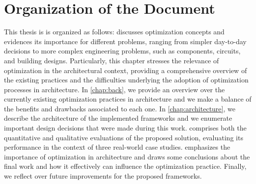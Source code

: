 \section{Organization of the Document}
This thesis is is organized as follows:  discusses optimization concepts and evidences its importance for different problems, ranging from simpler day-to-day decisions to more complex engineering problems, such as components, circuits, and building designs. Particularly, this chapter stresses the relevance of optimization in the architectural context, providing a comprehensive overview of the existing practices and the difficulties underlying the adoption of optimization processes in architecture.
In \cref{chap:back}, we provide an overview over the currently existing optimization practices in architecture and we make a balance of the benefits and drawbacks associated to each one. 
In \cref{chap:architecture}, we describe the architecture of the implemented frameworks and we enumerate important design decisions that were made during this work.
 comprises both the quantitative and qualitative evaluations of the proposed solution, evaluating its performance in the context of three real-world case studies. 
 emphasizes the importance of optimization in architecture and draws some conclusions about the final work and how it effectively can influence the optimization practice. Finally, we reflect over future improvements for the proposed frameworks.
